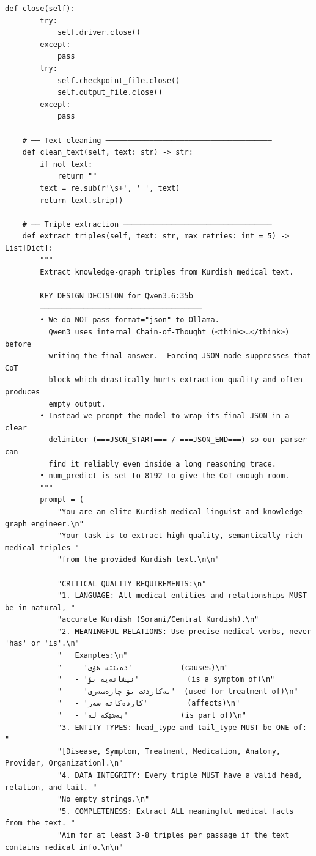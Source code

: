 \documentclass[11pt]{article}
\begin{document}
\begin{lstlisting}[style=pythoncode, caption={kg\_generator\_gpu\_0.py}]
    def close(self):
        try:
            self.driver.close()
        except:
            pass
        try:
            self.checkpoint_file.close()
            self.output_file.close()
        except:
            pass

    # ── Text cleaning ──────────────────────────────────────
    def clean_text(self, text: str) -> str:
        if not text:
            return ""
        text = re.sub(r'\s+', ' ', text)
        return text.strip()

    # ── Triple extraction ──────────────────────────────────
    def extract_triples(self, text: str, max_retries: int = 5) -> List[Dict]:
        """
        Extract knowledge-graph triples from Kurdish medical text.

        KEY DESIGN DECISION for Qwen3.6:35b
        ─────────────────────────────────────
        • We do NOT pass format="json" to Ollama.
          Qwen3 uses internal Chain-of-Thought (<think>…</think>) before
          writing the final answer.  Forcing JSON mode suppresses that CoT
          block which drastically hurts extraction quality and often produces
          empty output.
        • Instead we prompt the model to wrap its final JSON in a clear
          delimiter (===JSON_START=== / ===JSON_END===) so our parser can
          find it reliably even inside a long reasoning trace.
        • num_predict is set to 8192 to give the CoT enough room.
        """
        prompt = (
            "You are an elite Kurdish medical linguist and knowledge graph engineer.\n"
            "Your task is to extract high-quality, semantically rich medical triples "
            "from the provided Kurdish text.\n\n"

            "CRITICAL QUALITY REQUIREMENTS:\n"
            "1. LANGUAGE: All medical entities and relationships MUST be in natural, "
            "accurate Kurdish (Sorani/Central Kurdish).\n"
            "2. MEANINGFUL RELATIONS: Use precise medical verbs, never 'has' or 'is'.\n"
            "   Examples:\n"
            "   - 'دەبێتە هۆی'           (causes)\n"
            "   - 'نیشانەیە بۆ'           (is a symptom of)\n"
            "   - 'بەکاردێت بۆ چارەسەری'  (used for treatment of)\n"
            "   - 'کاردەکاتە سەر'         (affects)\n"
            "   - 'بەشێکە لە'            (is part of)\n"
            "3. ENTITY TYPES: head_type and tail_type MUST be ONE of: "
            "[Disease, Symptom, Treatment, Medication, Anatomy, Provider, Organization].\n"
            "4. DATA INTEGRITY: Every triple MUST have a valid head, relation, and tail. "
            "No empty strings.\n"
            "5. COMPLETENESS: Extract ALL meaningful medical facts from the text. "
            "Aim for at least 3-8 triples per passage if the text contains medical info.\n\n"


\end{lstlisting}
\end{document}
